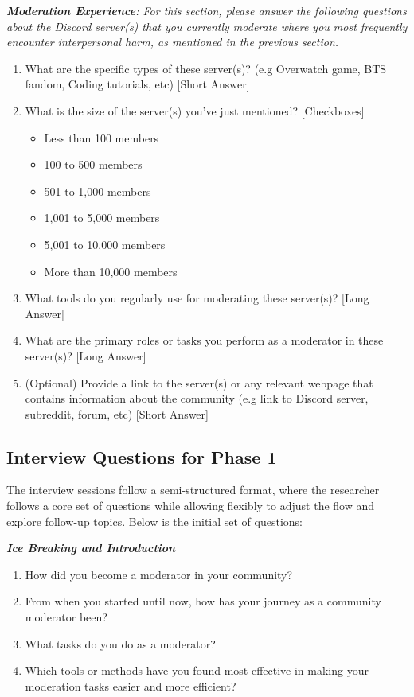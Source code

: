 \textit{\textbf{Moderation Experience}: For this section, please answer the following questions about the Discord server(s) that you currently moderate where you most frequently encounter interpersonal harm, as mentioned in the previous section.}
\begin{enumerate}
    \item What are the specific types of these server(s)? (e.g Overwatch game, BTS fandom, Coding tutorials, etc) [Short Answer]

    \item What is the size of the server(s) you've just mentioned? [Checkboxes]
    \begin{itemize}
        \item Less than 100 members
        \item 100 to 500 members
        \item 501 to 1,000 members
        \item 1,001 to 5,000 members
        \item 5,001 to 10,000 members
        \item More than 10,000 members
    \end{itemize}

    \item What tools do you regularly use for moderating these server(s)? [Long Answer]

    \item What are the primary roles or tasks you perform as a moderator in these server(s)? [Long Answer]

    \item (Optional) Provide a link to the server(s) or any relevant webpage that contains information about the community (e.g link to Discord server, subreddit, forum, etc) [Short Answer]
\end{enumerate}

\subsection{Interview Questions for Phase 1}
The interview sessions follow a semi-structured format, where the researcher follows a core set of questions while allowing flexibly to adjust the flow and explore follow-up topics. Below is the initial set of questions:

\textit{\textbf{Ice Breaking and Introduction}}
\begin{enumerate}
    \item How did you become a moderator in your community? 
    \item From when you started until now, how has your journey as a community moderator been?
    \item What tasks do you do as a moderator?
    \item Which tools or methods have you found most effective in making your moderation tasks easier and more efficient?
\end{enumerate}

